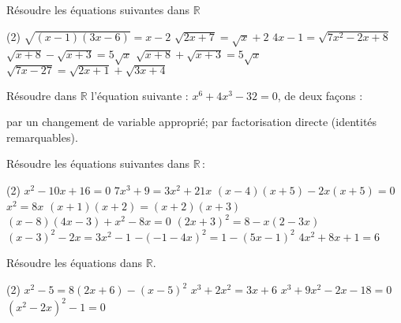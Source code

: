 \documentclass[a4paper,12pt]{report}
\begin{document}
\begin{exo}[3]
Résoudre les équations suivantes dans $\mathbb{R}$
\begin{tasks}(2)
\task $\sqrt{(x-1)(3 x-6)}=x-2$
\task $\sqrt{2 x+7}=\sqrt{x}+2$
\task $4 x-1=\sqrt{7 x^2-2 x+8}$
\task $\sqrt{x+8}-\sqrt{x+3}=5 \sqrt{x}$
\task $\sqrt{x+8}+\sqrt{x+3}=5 \sqrt{x}$
\task $\sqrt{7 x-27}=\sqrt{2 x+1}+\sqrt{3 x+4}$
\end{tasks}
\end{exo}

\begin{exo}[2]
Résoudre dans $\mathbb{R}$ l'équation suivante : $x^6+4 x^3-32=0$, de deux façons :
\begin{tasks}
\task par un changement de variable approprié;
\task par factorisation directe (identités remarquables).
\end{tasks}
\end{exo}


\begin{exo}
	Résoudre les équations suivantes dans $\mathbb{R}$\,:
	\begin{tasks}(2)
\task $x^2-10 x+16=0$
\task $7 x^3+9=3 x^2+21 x$
\task $(x-4)(x+5)-2 x(x+5)=0$
\task $x^2=8 x$
\task $(x+1)(x+2)=(x+2)(x+3)$
\task $(x-8)(4 x-3)+x^2-8 x=0$
\task $(2 x+3)^2=8-x(2-3 x)$
\task $(x-3)^2-2 x=3 x^2-1$
\task $-(-1-4 x)^2=1-(5 x-1)^2$
\task $4 x^2+8 x+1=6$
	\end{tasks}
\end{exo}
\begin{exo}
Résoudre les équations dans $\mathbb{R}$.
\begin{tasks}(2)	
\task $x^2-5=8(2 x+6)-(x-5)^2$
\task $x^3+2 x^2=3 x+6$
\task $x^3+9 x^2-2 x-18=0$
\task $\left(x^2-2 x\right)^2-1=0$
\end{tasks}
\end{exo}
\end{document}
